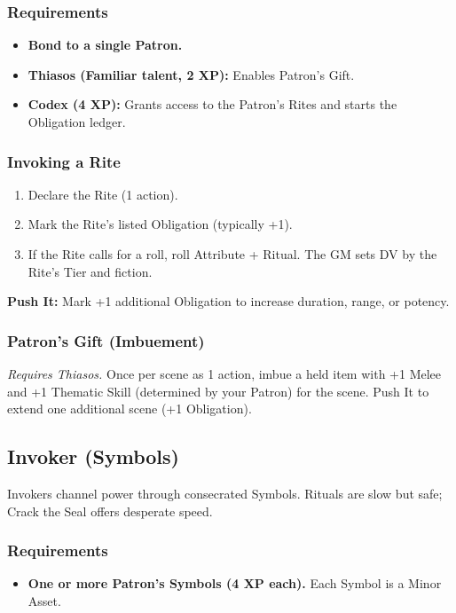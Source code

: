\subsubsection{Requirements}
\begin{itemize}
  \item \textbf{Bond to a single Patron.}
  \item \textbf{Thiasos (Familiar talent, 2 XP):} Enables Patron's Gift.
  \item \textbf{Codex (4 XP):} Grants access to the Patron's Rites and starts the Obligation ledger.
\end{itemize}

\subsubsection{Invoking a Rite}
\begin{enumerate}
  \item Declare the Rite (1 action).
  \item Mark the Rite's listed Obligation (typically +1).
  \item If the Rite calls for a roll, roll Attribute + Ritual. The GM sets DV by the Rite's Tier and fiction.
\end{enumerate}

\textbf{Push It:} Mark +1 additional Obligation to increase duration, range, or potency.

\subsubsection{Patron's Gift (Imbuement)}
\textit{Requires Thiasos.} Once per scene as 1 action, imbue a held item with +1 Melee and +1 Thematic Skill (determined by your Patron) for the scene. Push It to extend one additional scene (+1 Obligation).

\subsection{Invoker (Symbols)}

Invokers channel power through consecrated Symbols. Rituals are slow but safe; Crack the Seal offers desperate speed.

\subsubsection{Requirements}
\begin{itemize}
  \item \textbf{One or more Patron's Symbols (4 XP each).} Each Symbol is a Minor Asset.
\end{itemize}

